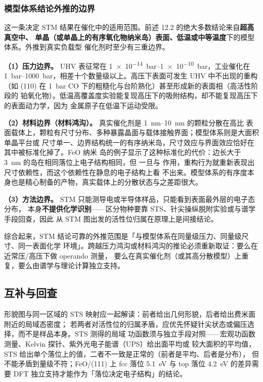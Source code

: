 \subsubsection{模型体系结论外推的边界}

这一条决定 STM 结果在催化中的适用范围。前述 12.2 的绝大多数结论来自\textbf{超高真空中、
单晶（或单晶上的有序氧化物纳米岛）表面、低温或中等温度}下的模型体系。外推到真实负载型
催化剂时至少有三重边界。

\textbf{（1）压力边界。} UHV 表征常在 \qtyrange{1e-14}{1e-10}{bar}，工业催化在
\qtyrange{1}{1000}{bar}，相差十个数量级以上。高压下表面可发生 UHV 中不出现的重构（如
(110) 在 \qty{1}{bar} CO 下的粗糙化与台阶熟化）甚至形成新的表面相（高活性阶段的
铂氧化物）。低温高覆盖度实验能复现高压下的吸附结构，却不能复现高压下的表面动力学，因为
金属原子在低温下运动受限。

\textbf{（2）材料边界（材料鸿沟）。} 真实催化剂是 \qtyrange{1}{10}{nm} 的颗粒分散在高比
表面载体上，颗粒有尺寸分布、多种暴露晶面与载体接触界面；模型体系则是大面积单晶平台或
尺寸单一、边界结构统一的有序纳米岛，尺寸效应与界面效应恰好在其中被标准化掉了。FeO 纳米
岛的例子显示了这种标准化的代价：边长大于 \qty{3}{nm} 的岛在相同落位上电子结构相同，但
一旦与  作用，重构行为就重新表现出尺寸依赖性，而这个依赖性在静息的电子结构上看
不出来。模型体系的有序度本身也是精心制备的产物，真实载体上的分散状态与之差距很大。

\textbf{（3）方法边界。} STM 只能测导电或半导体样品，只能看到表面最外层的电子态分布，
本身\textbf{不提供化学识别}——区分物种要靠 STS、针尖操纵脱附实验或与谱学手段回查，因此
从 STM 图出发的活性位归属在原理上是间接结论。

综合起来，STM 结论可靠的外推范围是「与模型体系在同量级压力、同量级尺寸、同一表面化学
环境」。跨越压力鸿沟或材料鸿沟的推论必须重新取证：要么在近常压/高压下做 operando 测量，
要么在真实催化剂（或其高分散模型）上重复，要么由谱学与理论计算独立支持。

\subsection{互补与回查}
\label{sec:stm-cross}

形貌图与同一区域的 STS 映射应一起解读：前者给出几何形貌，后者给出费米面附近的局域态密度；
若两者对活性位的归属矛盾，应优先怀疑针尖状态或偏压选择，而不是样品本身。STS 测得的局域
功函数须与独立手段对照——宏观功函数测量、Kelvin 探针、紫外光电子能谱（UPS）给出面平均或
较大面积的平均值，STS 给出单个落位上的值，二者不一致是正常的（前者是平均、后者是分布），
但不能矛盾到量级不符；FeO/(111) 上 fcc 落位 \qty{5.1}{eV} 与 top 落位
\qty{4.2}{eV} 的差异需要 DFT 独立支持才能作为「落位决定电子结构」的结论。

